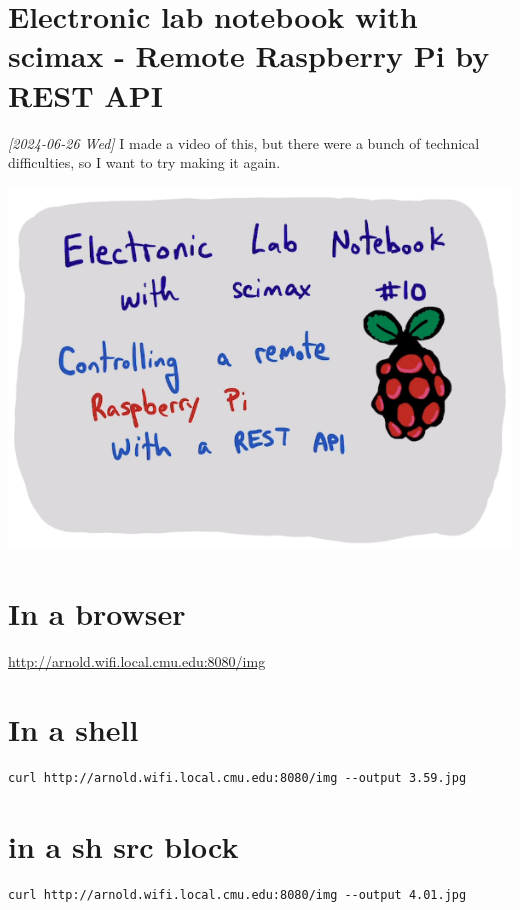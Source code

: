 \documentclass[11pt]{article}
\author{John Kitchin}
\date{\today}
\title{}
\begin{document}
\tableofcontents

\section{Electronic lab notebook with scimax - Remote Raspberry Pi by REST API}
\label{sec:org43c48ab}

\textit{{[}2024-06-26 Wed] } I made a video of this, but there were a bunch of technical difficulties, so I want to try making it again.

\begin{center}
\includegraphics[width=.9\linewidth]{./screenshots/date-26-06-2024-time-15-15-46.png}
\end{center}
\section{In a browser}
\label{sec:org633f68f}

\url{http://arnold.wifi.local.cmu.edu:8080/img}
\section{In a shell}
\label{sec:org5260150}

\begin{verbatim}
curl http://arnold.wifi.local.cmu.edu:8080/img --output 3.59.jpg
\end{verbatim}
\section{in a sh src block}
\label{sec:org8a1fe31}

\begin{verbatim}
curl http://arnold.wifi.local.cmu.edu:8080/img --output 4.01.jpg
\end{verbatim}
\end{document}
